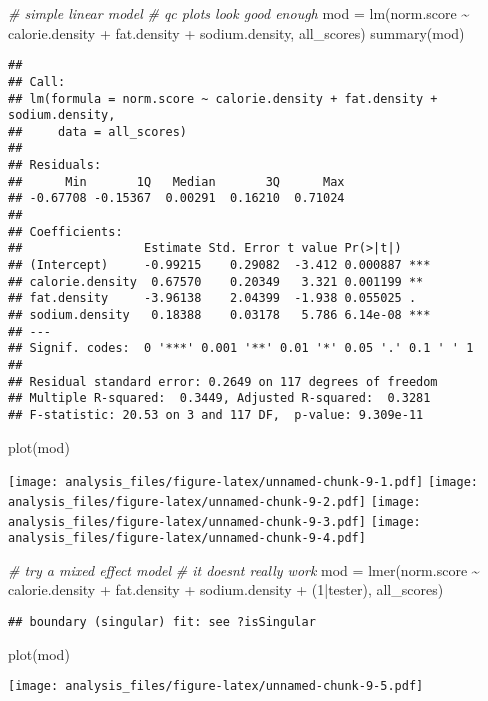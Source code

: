 \documentclass[
]{article}
\newenvironment{Shaded}{\begin{snugshade}}{\end{snugshade}}
\newcommand{\CommentTok}[1]{\textcolor[rgb]{0.56,0.35,0.01}{\textit{#1}}}
\newcommand{\DecValTok}[1]{\textcolor[rgb]{0.00,0.00,0.81}{#1}}
\newcommand{\FunctionTok}[1]{\textcolor[rgb]{0.00,0.00,0.00}{#1}}
\newcommand{\NormalTok}[1]{#1}
\newcommand{\OtherTok}[1]{\textcolor[rgb]{0.56,0.35,0.01}{#1}}
\newcommand{\SpecialCharTok}[1]{\textcolor[rgb]{0.00,0.00,0.00}{#1}}
\begin{document}
\begin{Shaded}
\begin{Highlighting}[]
\CommentTok{\# simple linear model}
\CommentTok{\# qc plots look good enough}
\NormalTok{mod }\OtherTok{=} \FunctionTok{lm}\NormalTok{(norm.score }\SpecialCharTok{\textasciitilde{}}\NormalTok{ calorie.density }\SpecialCharTok{+}\NormalTok{ fat.density }\SpecialCharTok{+}\NormalTok{ sodium.density, all\_scores)}
\FunctionTok{summary}\NormalTok{(mod)}
\end{Highlighting}
\end{Shaded}

\begin{verbatim}
## 
## Call:
## lm(formula = norm.score ~ calorie.density + fat.density + sodium.density, 
##     data = all_scores)
## 
## Residuals:
##      Min       1Q   Median       3Q      Max 
## -0.67708 -0.15367  0.00291  0.16210  0.71024 
## 
## Coefficients:
##                 Estimate Std. Error t value Pr(>|t|)    
## (Intercept)     -0.99215    0.29082  -3.412 0.000887 ***
## calorie.density  0.67570    0.20349   3.321 0.001199 ** 
## fat.density     -3.96138    2.04399  -1.938 0.055025 .  
## sodium.density   0.18388    0.03178   5.786 6.14e-08 ***
## ---
## Signif. codes:  0 '***' 0.001 '**' 0.01 '*' 0.05 '.' 0.1 ' ' 1
## 
## Residual standard error: 0.2649 on 117 degrees of freedom
## Multiple R-squared:  0.3449, Adjusted R-squared:  0.3281 
## F-statistic: 20.53 on 3 and 117 DF,  p-value: 9.309e-11
\end{verbatim}

\begin{Shaded}
\begin{Highlighting}[]
\FunctionTok{plot}\NormalTok{(mod)}
\end{Highlighting}
\end{Shaded}

\texttt{[image: analysis\_files/figure-latex/unnamed-chunk-9-1.pdf]}
\texttt{[image: analysis\_files/figure-latex/unnamed-chunk-9-2.pdf]}
\texttt{[image: analysis\_files/figure-latex/unnamed-chunk-9-3.pdf]}
\texttt{[image: analysis\_files/figure-latex/unnamed-chunk-9-4.pdf]}

\begin{Shaded}
\begin{Highlighting}[]
\CommentTok{\# try a mixed effect model}
\CommentTok{\# it doesn\textquotesingle{}t really work}
\NormalTok{mod }\OtherTok{=} \FunctionTok{lmer}\NormalTok{(norm.score }\SpecialCharTok{\textasciitilde{}}\NormalTok{ calorie.density }\SpecialCharTok{+}\NormalTok{ fat.density }\SpecialCharTok{+}\NormalTok{ sodium.density }\SpecialCharTok{+}\NormalTok{ (}\DecValTok{1}\SpecialCharTok{|}\NormalTok{tester), all\_scores)}
\end{Highlighting}
\end{Shaded}

\begin{verbatim}
## boundary (singular) fit: see ?isSingular
\end{verbatim}

\begin{Shaded}
\begin{Highlighting}[]
\FunctionTok{plot}\NormalTok{(mod)}
\end{Highlighting}
\end{Shaded}

\texttt{[image: analysis\_files/figure-latex/unnamed-chunk-9-5.pdf]}
\end{document}
